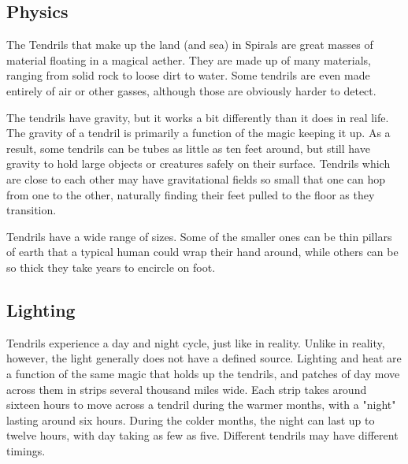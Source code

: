 \begin{multicols*}{2}
\section{Physics}
The Tendrils that make up the land (and sea) in Spirals are great masses of material floating in a magical aether.
They are made up of many materials, ranging from solid rock to loose dirt to water.
Some tendrils are even made entirely of air or other gasses, although those are obviously harder to detect.

The tendrils have gravity, but it works a bit differently than it does in real life.
The gravity of a tendril is primarily a function of the magic keeping it up.
As a result, some tendrils can be tubes as little as ten feet around, but still have gravity to hold large objects or creatures safely on their surface.
Tendrils which are close to each other may have gravitational fields so small that one can hop from one to the other, naturally finding their feet pulled to the floor as they transition.

Tendrils have a wide range of sizes. 
Some of the smaller ones can be thin pillars of earth that a typical human could wrap their hand around, while others can be so thick they take years to encircle on foot.

\subsection*{Lighting}
Tendrils experience a day and night cycle, just like in reality.
Unlike in reality, however, the light generally does not have a defined source.
Lighting and heat are a function of the same magic that holds up the tendrils, and patches of day move across them in strips several thousand miles wide.
Each strip takes around sixteen hours to move across a tendril during the warmer months, with a "night" lasting around six hours.
During the colder months, the night can last up to twelve hours, with day taking as few as five.
Different tendrils may have different timings.


\end{multicols*}
